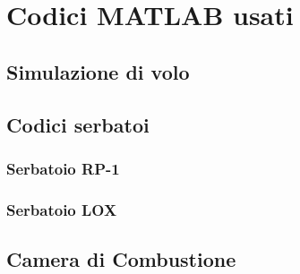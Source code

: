 \section{Codici MATLAB usati}
\label{appendix:codici}

\subsection{Simulazione di volo}



\subsection{Codici serbatoi}

\subsubsection{Serbatoio RP-1}


\subsubsection{Serbatoio LOX}


\subsection{Camera di Combustione}
